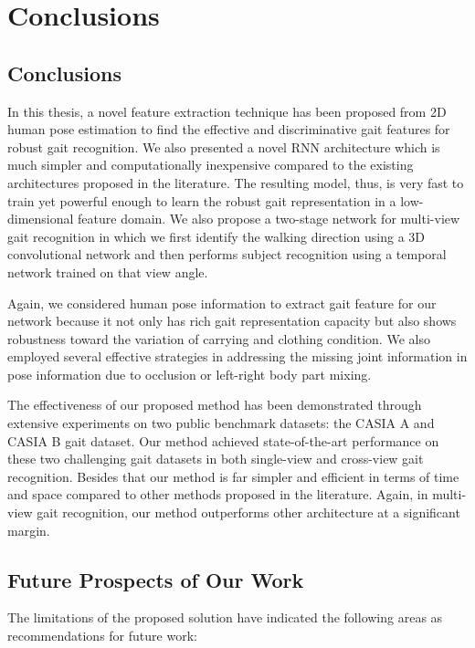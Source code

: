 \chapter{Conclusions}\label{ch:conclusion}

\section{Conclusions}
In this thesis, a novel feature extraction technique has been proposed from 2D human pose estimation to find the effective and discriminative gait features for robust gait recognition. We also presented a novel RNN architecture which is much simpler and computationally inexpensive compared to the existing architectures proposed in the literature. The resulting model, thus, is very fast to train yet powerful enough to learn the robust gait representation in a low-dimensional feature domain. We also propose a two-stage network for multi-view gait recognition in which we first identify the walking direction using a 3D convolutional network and then performs subject recognition using a temporal network trained on that view angle.

Again, we considered human pose information to extract gait feature for our network because it not only has rich gait representation capacity but also shows robustness toward the variation of carrying and clothing condition. We also employed several effective strategies in addressing the missing joint information in pose information due to occlusion or left-right body part mixing.

The effectiveness of our proposed method has been demonstrated through extensive experiments on two public benchmark datasets: the CASIA A and CASIA B gait dataset. Our method achieved state-of-the-art performance on these two challenging gait datasets in both single-view and cross-view gait recognition. Besides that our method is far simpler and efficient in terms of time and space compared to other methods proposed in the literature. Again, in multi-view gait recognition, our method outperforms other architecture at a significant margin. 


\section{Future Prospects of Our Work}
The limitations of the proposed solution have indicated the following areas as recommendations for future work:

